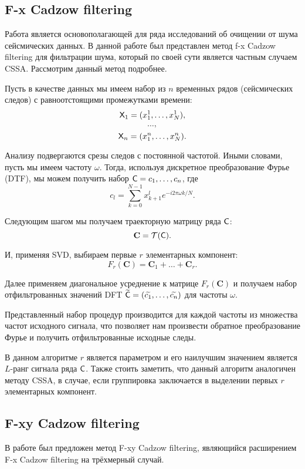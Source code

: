 \documentclass[specialist,
               substylefile = spbu.rtx,
               subf,href,colorlinks=true, 12pt]{disser}
\begin{document}
\subsection{F-x Cadzow filtering}

Работа \cite{Cadzow88} является основополагающей для ряда исследований об очищении от шума сейсмических данных. В данной работе был представлен метод f-x Cadzow filtering для фильтрации шума, который по своей сути является частным случаем CSSA. Рассмотрим данный метод подробнее.

Пусть в качестве данных мы имеем набор из $n$ временных рядов (сейсмических следов) с равноотстоящими промежутками времени:
$$\textsf{X}_1 = (x^1_1, \ldots, x^1_{N}),$$
$$\ldots,$$
$$\textsf{X}_n = (x^n_1, \ldots, x^n_N).$$

Анализу подвергаются срезы следов с постоянной частотой. Иными словами, пусть мы имеем частоту $\omega$. Тогда, используя дискретное преобразование Фурье (DTF), мы можем получить набор $\textsf{C} = c_1, \ldots, c_n$, где
$$c_l = \sum_{k = 0}^{N-1} x^{l}_{k+1} e^{-i 2 \pi \omega k / N}.$$

Следующим шагом мы получаем траекторную матрицу ряда $\textsf{C}$:
$$\mathbf{C} = \mathcal{T}(\textsf{C}).$$

И, применяя SVD, выбираем первые $r$ элементарных компонент:
$$F_r(\mathbf{C}) = \mathbf{C}_1 + \ldots + \mathbf{C}_r.$$

Далее применяем диагональное усреднение к матрице $F_r(\mathbf{C})$ и получаем набор отфильтрованных значений DFT $\widetilde{\textsf{C}} = (\widetilde{c_1}, \ldots, \widetilde{c_n})$ для частоты $\omega$.

Представленный набор процедур производится для каждой частоты из множества частот исходного сигнала, что позволяет нам произвести обратное преобразование Фурье и получить отфильтрованные исходные следы.

В данном алгоритме $r$ является параметром и его наилучшим значением является $L$-ранг сигнала ряда $\textsf{C}$. Также стоить заметить, что данный алгоритм аналогичен методу CSSA, в случае, если группировка заключается в выделении первых $r$ элементарных компонент.

\subsection{F-xy Cadzow filtering}

В работе \cite{Trickett2008} был предложен метод F-xy Cadzow filtering, являющийся расширением F-x Cadzow filtering на трёхмерный случай.
\end{document}
